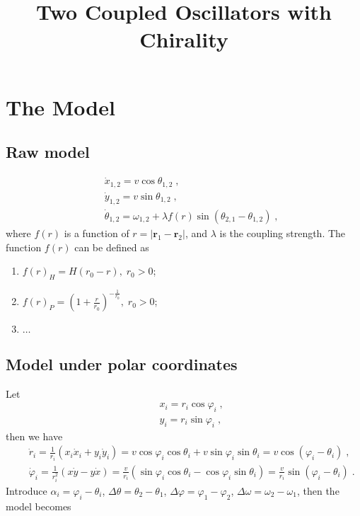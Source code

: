 \documentclass{article}
\title{\textbf{Two Coupled Oscillators with Chirality}}
\begin{document}
\maketitle

\section{The Model}

\subsection{Raw model}

\begin{eqnarray}
    &&\dot{x}_{1,2}=v\cos \theta _{1,2}\;,\\
    &&\dot{y}_{1,2}=v\sin \theta _{1,2}\;,\\
    &&\dot{\theta}_{1,2}=\omega _{1,2}+\lambda f\left( r \right) \sin \left( \theta _{2,1}-\theta _{1,2} \right)\;,
\end{eqnarray}
where $f\left( r \right)$ is a function of $r=\left| \mathbf{r}_1-\mathbf{r}_2 \right|$, and $\lambda$ is the coupling strength. The function $f\left( r \right)$ can be defined as

\begin{enumerate}
    \item $f\left( r \right) _H=H\left( r_0-r \right),\;r_0>0$;
    \item $f\left( r \right) _P=\left( 1+\frac{r}{r_0} \right) ^{-\frac{1}{r_0}},\;r_0>0$;
    \item $\dots$
\end{enumerate}

\subsection{Model under polar coordinates}

Let
\begin{eqnarray}
    &&x_i=r_i\cos \varphi _i\;,\\
	&&y_i=r_i\sin \varphi _i\;,
\end{eqnarray}
then we have
\begin{eqnarray}
    &&\dot{r}_i=\frac{1}{r_i}\left( x_i\dot{x}_i+y_i\dot{y}_i \right) =v\cos \varphi _i\cos \theta _i+v\sin \varphi _i\sin \theta _i=v\cos \left( \varphi _i-\theta _i \right) \;,\\
	&&\dot{\varphi}_i=\frac{1}{r_{i}^{2}}\left( x\dot{y}-y\dot{x} \right) =\frac{v}{r_i}\left( \sin \varphi _i\cos \theta _i-\cos \varphi _i\sin \theta _i \right) =\frac{v}{r_i}\sin \left( \varphi _i-\theta _i \right) \;.
\end{eqnarray}
Introduce $\alpha_i=\varphi_i-\theta_i$, $\Delta \theta =\theta _2-\theta _1$, $\Delta \varphi =\varphi _1-\varphi _2$, $\Delta \omega =\omega _2-\omega _1$, then the model becomes
\end{document}
